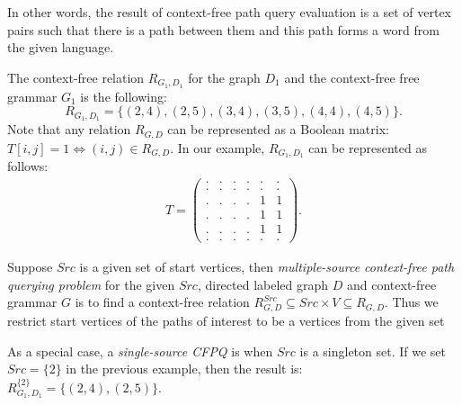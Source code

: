 In other words, the result of context-free path query evaluation is a set of vertex pairs such that there is a path between them and this path forms a word from the given language.

The context-free relation $R_{G_1,D_1}$ for the graph $D_1$ and the context-free free grammar $G_1$ is the following:
$$R_{G_1, D_1} = \{(2, 4), (2, 5), (3, 4), (3, 5), (4, 4), (4, 5)\}.$$
Note that any relation $R_{G, D}$ can be represented as a Boolean matrix: $T[i,j] = 1 \iff (i,j) \in R_{G, D}.$
In our example, $R_{G_1, D_1}$ can be represented as follows:
{
    \renewcommand{\arraystretch}{0.5}
    \setlength\arraycolsep{1.5pt}
\begin{align*}
T =
\begin{pmatrix}
    . & . & . & . & . & . \\
    . & . & . & . & . & . \\
    . & . & . & . & 1 & 1 \\
    . & . & . & . & 1 & 1 \\
    . & . & . & . & 1 & 1 \\
    . & . & . & . & . & .
\end{pmatrix}.
\end{align*}
}

\begin{definition}
    Suppose $Src$ is a given set of start vertices, then \textit{multiple-source context-free path querying problem} for the given $Src$, directed labeled graph $D$ and context-free grammar $G$ is to find a context-free relation
    $R_{G, D}^{Src} \subseteq Src\times V \subseteq R_{G,D}.$
    Thus we restrict start vertices of the paths of interest to be a vertices from the given set
\end{definition}

As a special case, a \emph{single-source CFPQ} is when $Src$ is a singleton set.
If we set $Src=\{2\}$ in the previous example, then the result is: $R_{G_1, D_1}^{\{2\}} = \{(2, 4), (2, 5)\}.$

